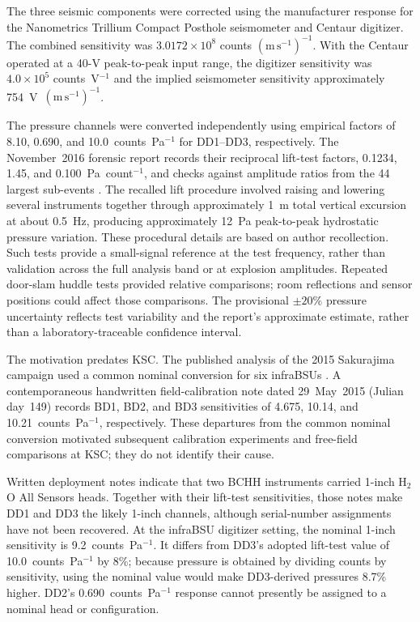 \documentclass[]{seismica}
\begin{document}
The three seismic components were corrected using the manufacturer response
for the Nanometrics Trillium Compact Posthole seismometer and Centaur digitizer.
The combined sensitivity was $3.0172\times10^8$ counts
$(\mathrm{m\,s^{-1}})^{-1}$. With the Centaur operated at a 40-V peak-to-peak
input range, the digitizer sensitivity was $4.0\times10^5$ counts~V$^{-1}$ and
the implied seismometer sensitivity approximately
754~V~$(\mathrm{m\,s^{-1}})^{-1}$.

The pressure channels were converted independently using empirical factors of
8.10, 0.690, and 10.0~counts~Pa$^{-1}$ for DD1--DD3, respectively.
The November~2016 forensic report records their reciprocal lift-test factors,
0.1234, 1.45, and 0.100~Pa~count$^{-1}$, and checks against amplitude ratios
from the 44 largest sub-events \citep{thompson_mcnutt_fireball_2016}.
The recalled lift procedure involved raising and lowering several instruments
together through approximately 1~m total vertical excursion at about 0.5~Hz,
producing approximately 12~Pa peak-to-peak hydrostatic pressure variation.
These procedural details are based on author recollection. Such tests provide
a small-signal reference at the test frequency, rather than validation across
the full analysis band or at explosion amplitudes. Repeated door-slam huddle
tests provided relative comparisons; room reflections and sensor positions
could affect those comparisons. The provisional $\pm20\%$ pressure uncertainty
reflects test variability and the report's approximate estimate, rather than
a laboratory-traceable confidence interval.

The motivation predates KSC. The published analysis of the 2015 Sakurajima
campaign used a common nominal conversion for six infraBSUs
\citep{smith_sakurajima_2020}. A contemporaneous handwritten field-calibration
note dated 29~May~2015 (Julian day~149) records BD1, BD2, and BD3 sensitivities
of 4.675, 10.14, and 10.21~counts~Pa$^{-1}$, respectively. These departures
from the common nominal conversion motivated subsequent calibration
experiments and free-field comparisons at KSC; they do not identify their cause.

Written deployment notes indicate that two BCHH instruments carried 1-inch
H$_2$O All Sensors heads. Together with their lift-test sensitivities, those
notes make DD1 and DD3 the likely 1-inch channels, although serial-number
assignments have not been recovered. At the infraBSU digitizer setting, the
nominal 1-inch sensitivity is 9.2~counts~Pa$^{-1}$. It differs from DD3's
adopted lift-test value of 10.0~counts~Pa$^{-1}$ by 8\%; because pressure is
obtained by dividing counts by sensitivity, using the nominal value would make
DD3-derived pressures 8.7\% higher. DD2's 0.690~counts~Pa$^{-1}$ response
cannot presently be assigned to a nominal head or configuration.
\end{document}
